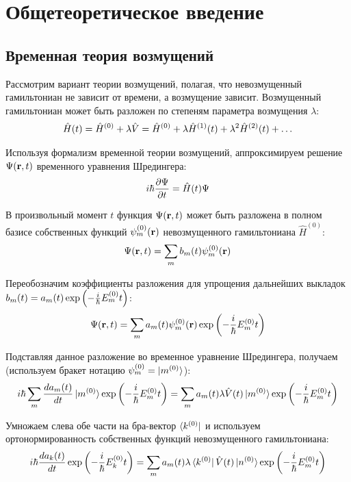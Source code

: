 \section{Общетеоретическое введение}
\subsection{Временная теория возмущений}

Рассмотрим вариант теории возмущений, полагая, что невозмущенный гамильтониан не зависит от времени, а возмущение зависит. Возмущенный гамильтониан может быть разложен по степеням параметра возмущения $\lambda$:
\vverh
\begin{gather}
	\hat{H}(t) = \hat{H}^{(0)} + \lambda \hat{V} = \hat{H}^{(0)} + \lambda \hat{H}^{(1)}(t) + \lambda^2 \hat{H}^{(2)}(t) + \dots \notag
\end{gather}

Используя формализм временной теории возмущений, аппроксимируем решение $\Psi(\mathbf{r}, t)$ временного уравнения Шредингера:
\vverh
\begin{gather}
	i \hbar \frac{\partial \Psi}{\partial t} = \hat{H}(t) \Psi \notag
\end{gather}

В произвольный момент $t$ функция $\Psi(\mathbf{r}, t)$ может быть разложена в полном базисе собственных функций $\psi_m^{(0)}(\mathbf{r})$ невозмущенного гамильтониана $\hat{H}^{(0)}$:
\vverh
\begin{gather}
	\Psi(\mathbf{r}, t) = \sum_m b_m(t) \psi_m^{(0)}(\mathbf{r}) \notag
\end{gather}

Переобозначим коэффициенты разложения для упрощения дальнейших выкладок $b_m(t) = a_m(t) \exp \left( - \frac{i}{\hbar} E_m^{(0)} t \right)$:
\vverh \vverh \vverh
\begin{gather}
	\Psi(\mathbf{r}, t) = \sum_m a_m(t) \psi_m^{(0)} (\mathbf{r}) \exp \left( - \frac{i}{\hbar} E_m^{(0)} t \right) \notag
\end{gather}

Подставляя данное разложение во временное уравнение Шредингера, получаем (используем бракет нотацию $\psi_m^{(0)} = \ket{m^{(0)}}$):
\vverh
\begin{gather}
	i \hbar \sum_m \frac{d a_m(t)}{dt} \ket{m^{(0)}} \exp \left( - \frac{i}{\hbar} E_m^{(0)} t \right) = \sum_m a_m(t) \lambda \hat{V}(t) \ket{m^{(0)}} \exp \left( - \frac{i}{\hbar} E_m^{(0)} t \right) \notag  
\end{gather}

Умножаем слева обе части на бра-вектор $\bra{k^{(0)}}$ и используем ортонормированность собственных функций невозмущенного гамильтониана:  
\vverh
\begin{gather}
	i \hbar \frac{d a_k(t)}{dt} \exp \left( - \frac{i}{\hbar} E_k^{(0)} t \right) = \sum_m a_m(t) \lambda \bra {k^{(0)}} \hat{V}(t) \ket{n^{(0)}} \exp \left( - \frac{i}{\hbar} E_m^{(0)} t \right) \notag 
\end{gather}

